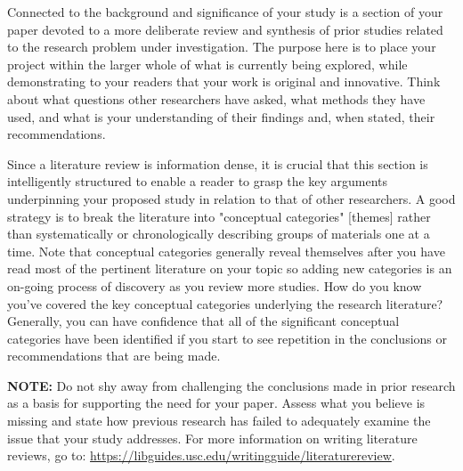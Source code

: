 \documentclass[10pt,twocolumn,letterpaper]{article}
\begin{document}
Connected to the background and significance of your study is a section of your paper devoted to a more deliberate review and synthesis of prior studies related to the research problem under investigation. The purpose here is to place your project within the larger whole of what is currently being explored, while demonstrating to your readers that your work is original and innovative. Think about what questions other researchers have asked, what methods they have used, and what is your understanding of their findings and, when stated, their recommendations.

Since a literature review is information dense, it is crucial that this section is intelligently structured to enable a reader to grasp the key arguments underpinning your proposed study in relation to that of other researchers. A good strategy is to break the literature into "conceptual categories" [themes] rather than systematically or chronologically describing groups of materials one at a time. Note that conceptual categories generally reveal themselves after you have read most of the pertinent literature on your topic so adding new categories is an on-going process of discovery as you review more studies. How do you know you've covered the key conceptual categories underlying the research literature? Generally, you can have confidence that all of the significant conceptual categories have been identified if you start to see repetition in the conclusions or recommendations that are being made.

\textbf{NOTE:} Do not shy away from challenging the conclusions made in prior research as a basis for supporting the need for your paper. Assess what you believe is missing and state how previous research has failed to adequately examine the issue that your study addresses. For more information on writing literature reviews, go to: \url{https://libguides.usc.edu/writingguide/literaturereview}.
\end{document}
